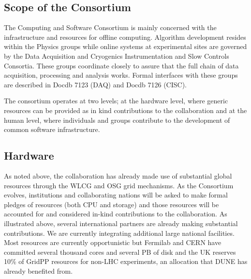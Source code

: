 \subsection{Scope of the Consortium}
The Computing and Software Consortium  is mainly concerned with the infrastructure and resources for offline computing.  Algorithm development resides within the Physics groups while online systems at experimental sites are governed by the Data Acquisition and Cryogenics Instrumentation and Slow Controls Consortia. These groups coordinate closely to assure that the full chain of data acquisition, processing and analysis works. Formal interfaces with these groups are described in Docdb 7123 (DAQ) and Docdb 7126 (CISC).

The consortium operates at two levels; at the hardware level, where generic resources can be provided as in kind contributions to the collaboration and at the human level, where individuals and groups contribute to the development of common software infrastructure. 

\subsection{Hardware}
As noted above, the collaboration has already made use of substantial global resources through the WLCG and OSG grid mechanisms. As the Consortium evolves, institutions and collaborating nations will be asked to make formal pledges of resources (both CPU and storage) and those resources will be accounted for and considered in-kind contributions to the collaboration.
As illustrated above, several international partners are already making substantial contributions. We are currently integrating additional large national facilities. Most resources are currently opportunistic but Fermilab and CERN have committed several thousand cores and several PB of disk and the UK reserves 10\% of GridPP resources for non-LHC experiments, an allocation that DUNE has already benefited from.


